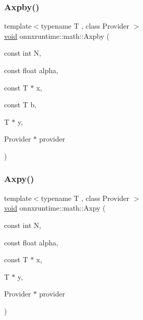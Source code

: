 \subsubsection{\texorpdfstring{Axpby()}{Axpby()}}
{\footnotesize\ttfamily template$<$typename T , class Provider $>$ \\
\mbox{\hyperlink{mlasi_8h_a88f941d423cb2a819b70a1358982b1a6}{void}} onnxruntime\+::math\+::\+Axpby (\begin{DoxyParamCaption}\item[{const int}]{N,  }\item[{const float}]{alpha,  }\item[{const T $\ast$}]{x,  }\item[{const T}]{b,  }\item[{T $\ast$}]{y,  }\item[{Provider $\ast$}]{provider }\end{DoxyParamCaption})}

\mbox{\label{namespaceonnxruntime_1_1math_aaf20425169de6c542cbcb95208c78357}} 
\subsubsection{\texorpdfstring{Axpy()}{Axpy()}\hspace{0.1cm}{\footnotesize\ttfamily [1/2]}}
{\footnotesize\ttfamily template$<$typename T , class Provider $>$ \\
\mbox{\hyperlink{mlasi_8h_a88f941d423cb2a819b70a1358982b1a6}{void}} onnxruntime\+::math\+::\+Axpy (\begin{DoxyParamCaption}\item[{const int}]{N,  }\item[{const float}]{alpha,  }\item[{const T $\ast$}]{x,  }\item[{T $\ast$}]{y,  }\item[{Provider $\ast$}]{provider }\end{DoxyParamCaption})}

\mbox{\label{namespaceonnxruntime_1_1math_a3f9e823f81e1ef442595fcfc405c426e}} 
